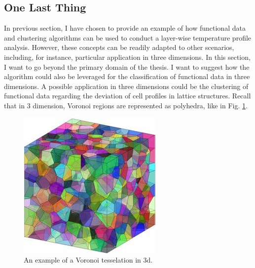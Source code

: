 \subsection{One Last Thing}
\label{subsec:devcell}
In previous section, I have chosen to provide an example of how functional data and clustering algorithms can be used to conduct a layer-wise temperature profile analysis. However, these concepts can be readily adapted to other scenarios, including, for instance, particular application in three dimensions. In this section, I want to go beyond the primary domain of the thesis. I want to suggest how the algorithm could also be leveraged for the classification of functional data in three dimensions. A possible application in three dimensions could be the clustering of functional data regarding the deviation of cell profiles in lattice structures. Recall that in 3 dimension, Voronoi regions are represented as polyhedra, like in Fig. \ref{fig:3dvoronoi}.

\begin{figure}[H]
    \centering
    \includegraphics[scale=0.43]{Images/3D-Voronoi-tessellation-with-1000-grains-unit-cell-with-its-internal-grains-not.png}
    \caption[3d Voronoi tessellation.]{An example of a Voronoi tesselation in 3d.}
    \label{fig:3dvoronoi}
\end{figure}

